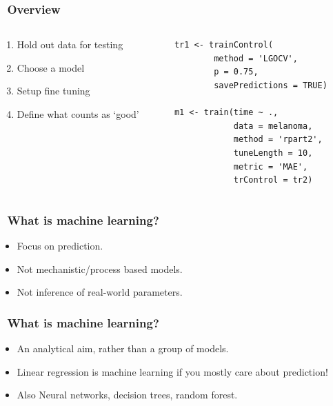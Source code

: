 \documentclass[handout, aspectratio = 169]{beamer}
\begin{document}
\begin{frame}[fragile]
\frametitle{\insertframenumber~Overview}

\begin{columns}
\begin{column}{0.4\textwidth}
   \begin{enumerate}
   \item Hold out data for testing \vspace{18mm}
   \item Choose a model\vspace{-1mm}
   \item Setup fine tuning \vspace{-1mm}
   \item Define what counts as `good'
   \end{enumerate}
\end{column}
\begin{column}{0.45\textwidth}  
\begin{Verbatim}
tr1 <- trainControl(
        method = 'LGOCV',
        p = 0.75,
        savePredictions = TRUE)

m1 <- train(time ~ ., 
            data = melanoma,
            method = 'rpart2',
            tuneLength = 10,
            metric = 'MAE',
            trControl = tr2)

\end{Verbatim}

\end{column}
\end{columns}


\end{frame} 




\begin{frame}
\frametitle{\insertframenumber~What is machine learning?}
\begin{itemize}
\item Focus on prediction.
\item Not mechanistic/process based models.
\item Not inference of real-world parameters.
\end{itemize}
\end{frame} 







\begin{frame}
\frametitle{\insertframenumber~What is machine learning?}

\begin{itemize}
\item An analytical aim, rather than a group of models.
\item Linear regression is machine learning if you mostly care about prediction!
\item Also Neural networks, decision trees, random forest.
\end{itemize}

\end{frame} 
\end{document}
